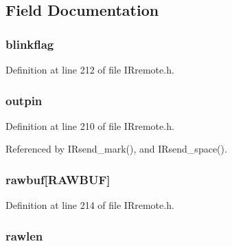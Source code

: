 \subsection{Field Documentation}
\hypertarget{structirparams__t_a1bf5117b95b2ced3fbba930ad2b41aa7}{
\subsubsection[{blinkflag}]{ blinkflag}}\label{structirparams__t_a1bf5117b95b2ced3fbba930ad2b41aa7}


Definition at line 212 of file I\-Rremote.\-h.

\hypertarget{structirparams__t_ac90c4f59fb73d64a42331fcb09778461}{
\subsubsection[{outpin}]{ outpin}}\label{structirparams__t_ac90c4f59fb73d64a42331fcb09778461}


Definition at line 210 of file I\-Rremote.\-h.



Referenced by I\-Rsend\-\_\-mark(), and I\-Rsend\-\_\-space().

\hypertarget{structirparams__t_a94732347617676924147d2b6deab4cda}{
\subsubsection[{rawbuf}]{ rawbuf\mbox{[}{\bf R\-A\-W\-B\-U\-F}\mbox{]}}}\label{structirparams__t_a94732347617676924147d2b6deab4cda}


Definition at line 214 of file I\-Rremote.\-h.

\hypertarget{structirparams__t_a709f7aaae8e4e2aa1e5d5d261137eb70}{
\subsubsection[{rawlen}]{ rawlen}}\label{structirparams__t_a709f7aaae8e4e2aa1e5d5d261137eb70}


